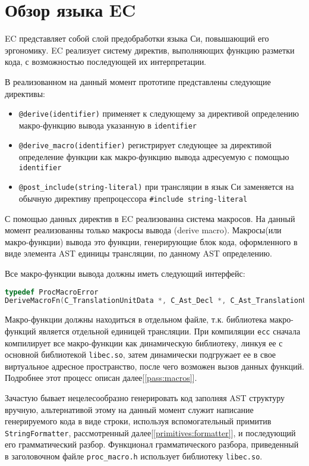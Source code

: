 \section{Обзор языка EC}

EC представляет собой слой предобработки языка Си, повышающий его эргономику.
EC реализует систему директив, выполняющих функцию разметки кода, с возможностью последующей их интерпретации.

В реализованном на данный момент прототипе представлены следующие директивы:
\begin{itemize}
\item \verb|@derive(identifier)| применяет к следующему за директивой определению макро-функцию вывода указанную в \verb|identifier|
\item \verb|@derive_macro(identifier)| регистрирует следующее за директивой определение функции как макро-функцию вывода адресуемую с помощью \verb|identifier|
\item \verb|@post_include(string-literal)| при трансляции в язык Си заменяется на обычную директиву препроцессора \verb|#include string-literal|
\end{itemize}

С помощью данных директив в EC реализованна система макросов. На данный момент реализованны только макросы вывода (derive macro).
Макросы(или макро-функции) вывода это функции, генерирующие блок кода, оформленного в виде элемента AST единицы трансляции, по данному AST определению.

Все макро-функции вывода должны иметь следующий интерфейс:
\begin{lstlisting}[language=C]
typedef ProcMacroError
DeriveMacroFn(C_TranslationUnitData *, C_Ast_Decl *, C_Ast_TranslationUnit **);
\end{lstlisting}

Макро-функции должны находиться в отдельном файле, т.к. библиотека макро-функций является отдельной единицей трансляции.
При компиляции \verb|ecc| сначала компилирует все макро-функции как динамическую библиотеку, линкуя ее с основной библиотекой \verb|libec.so|, затем динамически подгружает ее в свое виртуальное адресное пространство, после чего возможен вызов данных функций.
Подробнее этот процесс описан далее[\ref{pass:macros}].

Зачастую бывает нецелесообразно генерировать код заполняя AST структуру вручную, альтернативой этому на данный момент служит написание генерируемого кода в виде строки,
используя вспомогательный примитив \verb|StringFormatter|, рассмотренный далее[\ref{primitives:formatter}], и последующий его грамматический разбор.
Функционал грамматического разбора, приведенный в заголовочном файле \verb|proc_macro.h| использует библиотеку \verb|libec.so|.

